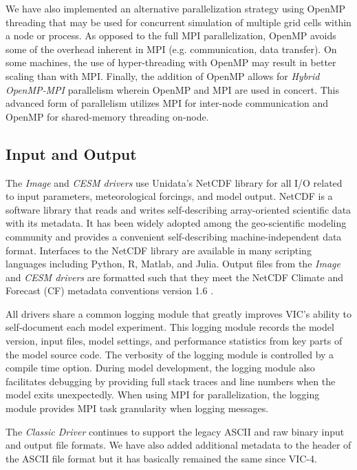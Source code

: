 \documentclass[gmd, manuscript]{copernicus}
\begin{document}
    We have also implemented an alternative parallelization strategy using OpenMP threading that may be used for concurrent simulation of multiple grid cells within a node or process. As opposed to the full MPI parallelization, OpenMP avoids some of the overhead inherent in MPI (e.g. communication, data transfer). On some machines, the use of hyper-threading with OpenMP may result in better scaling than with MPI. Finally, the addition of OpenMP allows for \textit{Hybrid OpenMP-MPI} parallelism wherein OpenMP and MPI are used in concert. This advanced form of parallelism utilizes MPI for inter-node communication and OpenMP for shared-memory threading on-node.

  \subsection{Input and Output}
    \label{sec:io}
    The \textit{Image} and \textit{CESM drivers} use Unidata's NetCDF library for all I/O related to input parameters, meteorological forcings, and model output. NetCDF is a software library that reads and writes self-describing array-oriented scientific data with its metadata. It has been widely adopted among the geo-scientific modeling community and provides a convenient self-describing machine-independent data format. Interfaces to the NetCDF library are available in many scripting languages including Python, R, Matlab, and Julia. Output files from the \textit{Image} and \textit{CESM drivers} are formatted such that they meet the NetCDF Climate and Forecast (CF) metadata conventions version 1.6 \citep{Eaton_2003}.

    All drivers share a common logging module that greatly improves VIC's ability to self-document each model experiment. This logging module records the model version, input files, model settings, and performance statistics from key parts of the model source code. The verbosity of the logging module is controlled by a compile time option. During model development, the logging module also facilitates debugging by providing full stack traces and line numbers when the model exits unexpectedly. When using MPI for parallelization, the logging module provides MPI task granularity when logging messages.

    The \textit{Classic Driver} continues to support the legacy ASCII and raw binary input and output file formats. We have also added additional metadata to the header of the ASCII file format but it has basically remained the same since VIC-4.
\end{document}
